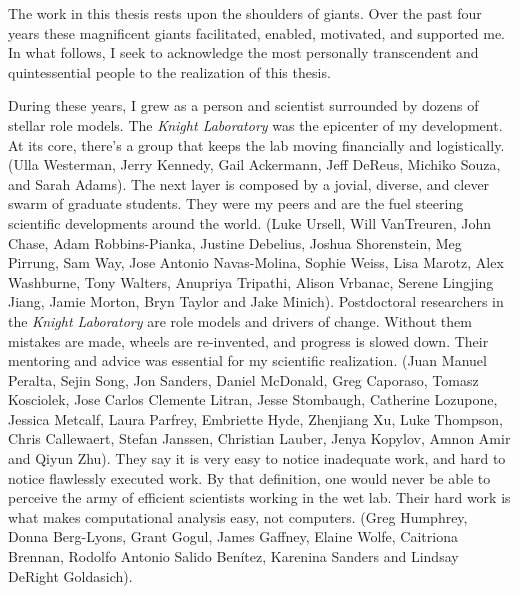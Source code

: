 \begin{frontmatter}
\printglossary[title=List of Abbreviations,toctitle=List of Abbreviations,nonumberlist ]
\listoffigures  %
\listoftables   %

%
%
\begin{acknowledgements}

    The work in this thesis rests upon the shoulders of giants. Over the past 
    four years these magnificent giants facilitated, enabled, motivated, and 
    supported me.  In what follows, I seek to acknowledge the most personally 
    transcendent and quintessential people to the realization of this thesis.

    During these years, I grew as a person and scientist surrounded by dozens 
    of stellar role models. The \textit{Knight Laboratory} was the epicenter of 
    my development. At its core, there's a group that keeps the lab moving 
    financially and logistically. (Ulla Westerman, Jerry Kennedy, Gail 
    Ackermann, Jeff DeReus, Michiko Souza, and Sarah Adams). The next layer is 
    composed by a jovial, diverse, and clever swarm of graduate students.  They 
    were my peers and are the fuel steering scientific developments around the 
    world. (Luke Ursell, Will VanTreuren, John Chase, Adam Robbins-Pianka, 
    Justine Debelius, Joshua Shorenstein, Meg Pirrung, Sam Way, Jose Antonio 
    Navas-Molina, Sophie Weiss, Lisa Marotz, Alex Washburne, Tony Walters, 
    Anupriya Tripathi, Alison Vrbanac, Serene Lingjing Jiang, Jamie Morton, 
    Bryn Taylor and Jake Minich). Postdoctoral researchers in the 
    \textit{Knight Laboratory} are role models and drivers of change. Without 
    them mistakes are made, wheels are re-invented, and progress is slowed 
    down. Their mentoring and advice was essential for my scientific 
    realization. (Juan Manuel Peralta, Sejin Song, Jon Sanders, Daniel 
    McDonald, Greg Caporaso, Tomasz Kosciolek, Jose Carlos Clemente Litran, 
    Jesse Stombaugh, Catherine Lozupone, Jessica Metcalf, Laura Parfrey, 
    Embriette Hyde, Zhenjiang Xu, Luke Thompson, Chris Callewaert, Stefan 
    Janssen, Christian Lauber, Jenya Kopylov, Amnon Amir and Qiyun Zhu).  They 
    say it is very easy to notice inadequate work, and hard to notice 
    flawlessly executed work. By that definition, one would never be able to 
    perceive the army of efficient scientists working in the wet lab.  Their 
    hard work is what makes computational analysis easy, not computers.  (Greg 
    Humphrey, Donna Berg-Lyons, Grant Gogul, James Gaffney, Elaine Wolfe, 
    Caitriona Brennan, Rodolfo Antonio Salido Ben\'itez, Karenina Sanders and 
    Lindsay DeRight Goldasich).


\end{acknowledgements}
\end{frontmatter}
